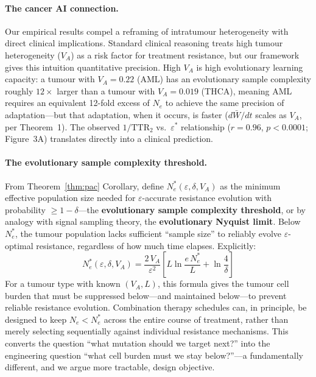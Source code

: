 \documentclass[12pt]{article}
\theoremstyle{remark}
\begin{document}
\paragraph{The cancer AI connection.} Our empirical results compel a reframing of intratumour heterogeneity with direct clinical implications. Standard clinical reasoning treats high tumour heterogeneity ($V_A$) as a risk factor for treatment resistance, but our framework gives this intuition quantitative precision. High $V_A$ is high evolutionary learning capacity: a tumour with $V_A = 0.22$ (AML) has an evolutionary sample complexity roughly $12\times$ larger than a tumour with $V_A = 0.019$ (THCA), meaning AML requires an equivalent 12-fold excess of $N_e$ to achieve the same precision of adaptation---but that adaptation, when it occurs, is faster ($d\bar{W}/dt$ scales as $V_A$, per Theorem~1). The observed $1/\mathrm{TTR}_2$ vs.\ $\varepsilon^*$ relationship ($r = 0.96$, $p < 0.0001$; Figure~3A) translates directly into a clinical prediction.

\paragraph{The evolutionary sample complexity threshold.} From Theorem~\ref{thm:pac} Corollary, define $N_e^*(\varepsilon, \delta, V_A)$ as the minimum effective population size needed for $\varepsilon$-accurate resistance evolution with probability $\geq 1-\delta$---the \textbf{evolutionary sample complexity threshold}, or by analogy with signal sampling theory, the \textbf{evolutionary Nyquist limit}. Below $N_e^*$, the tumour population lacks sufficient ``sample size'' to reliably evolve $\varepsilon$-optimal resistance, regardless of how much time elapses. Explicitly:
\[
  N_e^*(\varepsilon, \delta, V_A) = \frac{2\,V_A}{\varepsilon^2}\!\left[L\ln\frac{e\,N_e^*}{L} + \ln\frac{4}{\delta}\right]
\]
For a tumour type with known $(V_A, L)$, this formula gives the tumour cell burden that must be suppressed below---and maintained below---to prevent reliable resistance evolution. Combination therapy schedules can, in principle, be designed to keep $N_e < N_e^*$ across the entire course of treatment, rather than merely selecting sequentially against individual resistance mechanisms. This converts the question ``what mutation should we target next?'' into the engineering question ``what cell burden must we stay below?''---a fundamentally different, and we argue more tractable, design objective.
\end{document}
